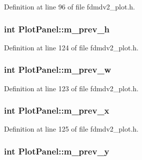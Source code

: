 Definition at line 96 of file fdmdv2\-\_\-plot.\-h.

\hypertarget{class_plot_panel_af85cf51a62f09adf0cbb4eb35d7cfc97}{
\subsubsection[{m\-\_\-prev\-\_\-h}]{\setlength{\rightskip}{0pt plus 5cm}int Plot\-Panel\-::m\-\_\-prev\-\_\-h\hspace{0.3cm}{\ttfamily [protected]}}}\label{class_plot_panel_af85cf51a62f09adf0cbb4eb35d7cfc97}


Definition at line 124 of file fdmdv2\-\_\-plot.\-h.

\hypertarget{class_plot_panel_a398b423039df00405f2f23b786a02b0d}{
\subsubsection[{m\-\_\-prev\-\_\-w}]{\setlength{\rightskip}{0pt plus 5cm}int Plot\-Panel\-::m\-\_\-prev\-\_\-w\hspace{0.3cm}{\ttfamily [protected]}}}\label{class_plot_panel_a398b423039df00405f2f23b786a02b0d}


Definition at line 123 of file fdmdv2\-\_\-plot.\-h.

\hypertarget{class_plot_panel_ab38a4323755a529cbdab28a5854ffc06}{
\subsubsection[{m\-\_\-prev\-\_\-x}]{\setlength{\rightskip}{0pt plus 5cm}int Plot\-Panel\-::m\-\_\-prev\-\_\-x\hspace{0.3cm}{\ttfamily [protected]}}}\label{class_plot_panel_ab38a4323755a529cbdab28a5854ffc06}


Definition at line 125 of file fdmdv2\-\_\-plot.\-h.

\hypertarget{class_plot_panel_a2e1ea18bbea07dd04acc76567a993070}{
\subsubsection[{m\-\_\-prev\-\_\-y}]{\setlength{\rightskip}{0pt plus 5cm}int Plot\-Panel\-::m\-\_\-prev\-\_\-y\hspace{0.3cm}{\ttfamily [protected]}}}\label{class_plot_panel_a2e1ea18bbea07dd04acc76567a993070}


